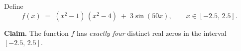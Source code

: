 \begin{problem}
Define
\[
  f(x) \;=\; (x^{2} - 1)\,(x^{2} - 4) \;+\; 3\sin(50 x),
  \qquad x \in [-2.5,\, 2.5].
\]

\textbf{Claim.} The function $f$ has \emph{exactly four} distinct real
zeros in the interval $[-2.5,\, 2.5]$.
\end{problem}
